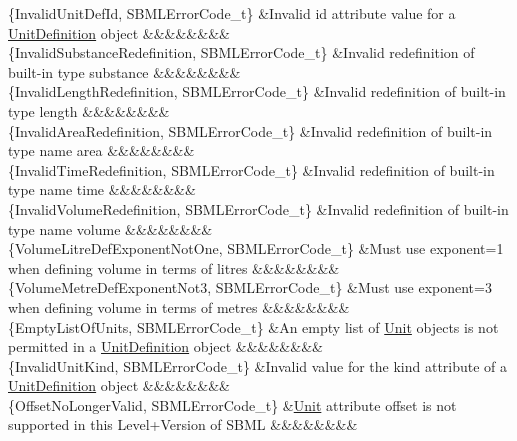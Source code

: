 \begin{DoxyParagraph}{}
\begin{longtabu}
\{Invalid\+Unit\+Def\+Id, S\+B\+M\+L\+Error\+Code\+\_\+t\} &Invalid \textquotesingle{}id\textquotesingle{} attribute value for a \hyperlink{class_unit_definition}{Unit\+Definition} object &&&&&&&&\\
\{Invalid\+Substance\+Redefinition, S\+B\+M\+L\+Error\+Code\+\_\+t\} &Invalid redefinition of built-\/in type \textquotesingle{}substance\textquotesingle{} &&&&&&&&\\
\{Invalid\+Length\+Redefinition, S\+B\+M\+L\+Error\+Code\+\_\+t\} &Invalid redefinition of built-\/in type \textquotesingle{}length\textquotesingle{} &&&&&&&&\\
\{Invalid\+Area\+Redefinition, S\+B\+M\+L\+Error\+Code\+\_\+t\} &Invalid redefinition of built-\/in type name \textquotesingle{}area\textquotesingle{} &&&&&&&&\\
\{Invalid\+Time\+Redefinition, S\+B\+M\+L\+Error\+Code\+\_\+t\} &Invalid redefinition of built-\/in type name \textquotesingle{}time\textquotesingle{} &&&&&&&&\\
\{Invalid\+Volume\+Redefinition, S\+B\+M\+L\+Error\+Code\+\_\+t\} &Invalid redefinition of built-\/in type name \textquotesingle{}volume\textquotesingle{} &&&&&&&&\\
\{Volume\+Litre\+Def\+Exponent\+Not\+One, S\+B\+M\+L\+Error\+Code\+\_\+t\} &Must use \textquotesingle{}exponent\textquotesingle{}=1 when defining \textquotesingle{}volume\textquotesingle{} in terms of litres &&&&&&&&\\
\{Volume\+Metre\+Def\+Exponent\+Not3, S\+B\+M\+L\+Error\+Code\+\_\+t\} &Must use \textquotesingle{}exponent\textquotesingle{}=3 when defining \textquotesingle{}volume\textquotesingle{} in terms of metres &&&&&&&&\\
\{Empty\+List\+Of\+Units, S\+B\+M\+L\+Error\+Code\+\_\+t\} &An empty list of \hyperlink{class_unit}{Unit} objects is not permitted in a \hyperlink{class_unit_definition}{Unit\+Definition} object &&&&&&&&\\
\{Invalid\+Unit\+Kind, S\+B\+M\+L\+Error\+Code\+\_\+t\} &Invalid value for the \textquotesingle{}kind\textquotesingle{} attribute of a \hyperlink{class_unit_definition}{Unit\+Definition} object &&&&&&&&\\
\{Offset\+No\+Longer\+Valid, S\+B\+M\+L\+Error\+Code\+\_\+t\} &\hyperlink{class_unit}{Unit} attribute \textquotesingle{}offset\textquotesingle{} is not supported in this Level+\+Version of S\+B\+ML &&&&&&&&\\

\end{longtabu}
\end{DoxyParagraph}

